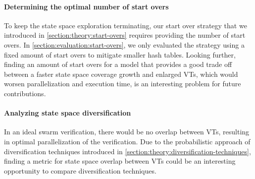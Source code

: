\documentclass[
fancyheadings, %
%
%
]{stsreprt}
\begin{document}
\paragraph{Determining the optimal number of start overs}
To keep the state space exploration terminating, our start over strategy that we introduced in \cref{section:theory:start-overs} requires providing the number of start overs.
In \cref{section:evaluation:start-overs}, we only evaluated the strategy using a fixed amount of start overs to mitigate smaller hash tables.
Looking further, finding an amount of start overs for a model that provides a good trade off between a faster state space coverage growth and enlarged VTs, which would worsen parallelization and execution time, is an interesting problem for future contributions.

\paragraph{Analyzing state space diversification}
In an ideal swarm verification, there would be no overlap between VTs, resulting in optimal parallelization of the verification.
Due to the probabilistic approach of diversification techniques introduced in \cref{section:theory:diversification-techniques}, finding a metric for state space overlap between VTs could be an interesting opportunity to compare diversification techniques.



\backmatter

\printbibliography[heading=bibintoc]
\end{document}
